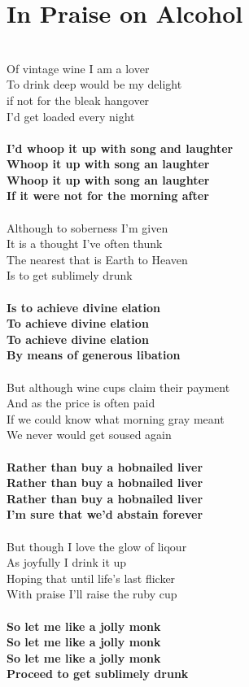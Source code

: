 \documentclass[letterpaper,14pt]{extarticle}
\begin{document}
\section{In Praise on Alcohol}
\noindent
\\Of vintage wine I am a lover
\\To drink deep would be my delight
\\if not for the bleak hangover
\\I'd get loaded every night
\\
\\\textbf{I'd whoop it up with song and laughter
\\Whoop it up with song an laughter
\\Whoop it up with song an laughter
\\If it were not for the morning after}
\\
\\Although to soberness I'm given
\\It is a thought I've often thunk
\\The nearest that is Earth to Heaven
\\Is to get sublimely drunk
\\
\\\textbf{Is to achieve divine elation
\\To achieve divine elation
\\To achieve divine elation
\\By means of generous libation}
\\
\\But although wine cups claim their payment
\\And as the price is often paid
\\If we could know what morning gray meant
\\We never would get soused again
\\
\\\textbf{Rather than buy a hobnailed liver
\\Rather than buy a hobnailed liver
\\Rather than buy a hobnailed liver
\\I'm sure that we'd abstain forever}
\\
\\But though I love the glow of liqour
\\As joyfully I drink it up
\\Hoping that until life's last flicker
\\With praise I'll raise the ruby cup
\\
\\\textbf{So let me like a jolly monk
\\So let me like a jolly monk
\\So let me like a jolly monk
\\Proceed to get sublimely drunk}
\end{document}
